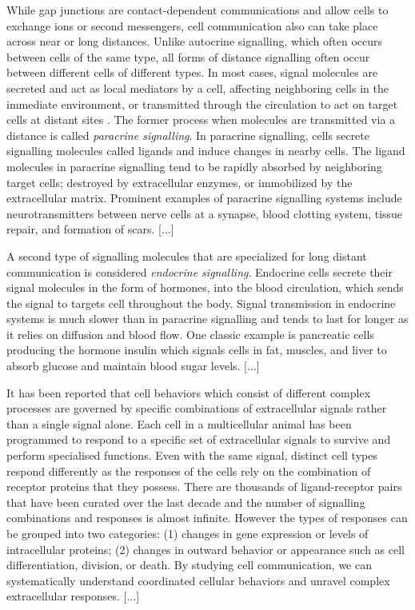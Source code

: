 While gap junctions are contact-dependent communications and allow cells to exchange ions or second messengers, cell communication also can take place across near or long distances. Unlike autocrine signalling, which often occurs  between cells of the same type, all forms of distance signalling often occur between different cells of different types. In most cases, signal molecules are secreted and act as local mediators by a cell, affecting neighboring cells in the immediate environment, or transmitted through the circulation to act on target cells at distant sites \cite{cooper2004cell, alberts2018molecular}. The former process when molecules are transmitted via a distance is called \textit{paracrine signalling}. In paracrine signalling, cells secrete signalling molecules called ligands and induce changes in nearby cells. The ligand molecules in paracrine signalling tend to be rapidly absorbed by neighboring target cells; destroyed by extracellular enzymes, or immobilized by the extracellular matrix. Prominent examples of paracrine signalling systems include neurotransmitters between nerve cells at a synapse,  blood clotting system, tissue repair, and formation of scars. [...]

A second type of signalling molecules that are specialized for long distant communication is considered \textit{endocrine signalling}. Endocrine cells secrete their signal molecules in the form of hormones, into the blood circulation, which sends the signal to targets cell throughout the body. Signal transmission in endocrine systems is much slower than in paracrine signalling and tends to last for longer as it relies on diffusion and blood flow. One classic example is pancreatic cells producing the hormone insulin which signals cells in fat, muscles, and liver to absorb glucose and maintain blood sugar levels. [...]

It has been reported that cell behaviors which consist of different complex processes are governed by specific combinations of extracellular signals rather than a single signal alone. Each cell in a multicellular animal has been programmed to respond to a specific set of extracellular signals to survive and perform specialised functions. Even with the same signal, distinct cell types respond differently as the responses of the cells rely on the combination of receptor proteins that they possess. There are thousands of ligand-receptor pairs that have been curated over the last decade \cite{salwinski2004database, orchard2012protein} and the number of signalling combinations and responses is almost infinite. However the types of responses can be grouped into two categories: (1) changes in gene expression or levels of intracellular proteins; (2) changes in outward behavior or appearance such as cell differentiation, division, or death. By studying cell communication, we can systematically understand coordinated  cellular behaviors and unravel complex extracellular responses. [...]

